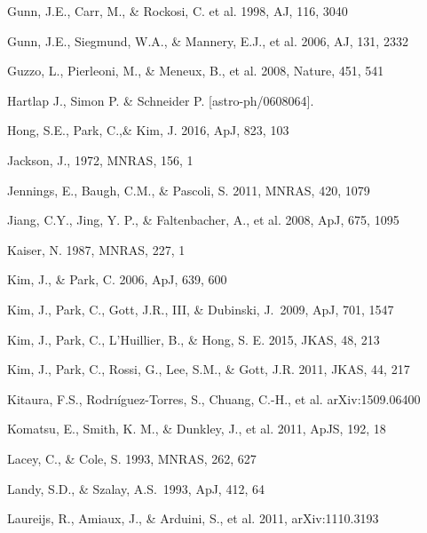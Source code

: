 \documentclass[iop]{emulateapj}
\begin{document}
\begin{thebibliography}{}
Gunn, J.E., Carr, M., \& Rockosi, C. et al. 1998, AJ, 116, 3040

Gunn, J.E., Siegmund, W.A., \& Mannery, E.J., et al. 2006, AJ, 131, 2332

Guzzo, L., Pierleoni, M., \& Meneux, B., et al. 2008, Nature, 451, 541

Hartlap J., Simon P. \& Schneider P. [astro-ph/0608064].


Hong, S.E., Park, C.,\&  Kim, J. 2016, ApJ, 823, 103

Jackson, J., 1972, MNRAS, 156, 1

Jennings, E., Baugh, C.M., \& Pascoli, S. 2011, MNRAS, 420, 1079  


Jiang, C.Y., Jing, Y. P., \& Faltenbacher, A., et al. 2008, ApJ, 675, 1095

Kaiser, N. 1987, MNRAS, 227, 1


Kim, J., \& Park, C. 2006, ApJ, 639, 600  

Kim, J., Park, C., Gott, J.R., III, \& Dubinski, J.\ 2009, ApJ, 701, 1547 

Kim, J., Park, C., L'Huillier, B., \& Hong, S. E. 2015, JKAS, 48, 213

Kim, J., Park, C., Rossi, G., Lee, S.M., \& Gott, J.R. 2011, JKAS, 44, 217  

Kitaura, F.S., Rodrı\'{i}guez-Torres, S., Chuang, C.-H., et al. arXiv:1509.06400

Komatsu, E., Smith, K. M., \& Dunkley, J., et al. 2011, ApJS, 192, 18  

Lacey, C., \& Cole, S. 1993, MNRAS, 262, 627


Landy, S.D., \& Szalay, A.S.\ 1993, ApJ, 412, 64 

Laureijs, R., Amiaux, J., \& Arduini, S., et al. 2011, arXiv:1110.3193


\end{thebibliography}
\end{document}
